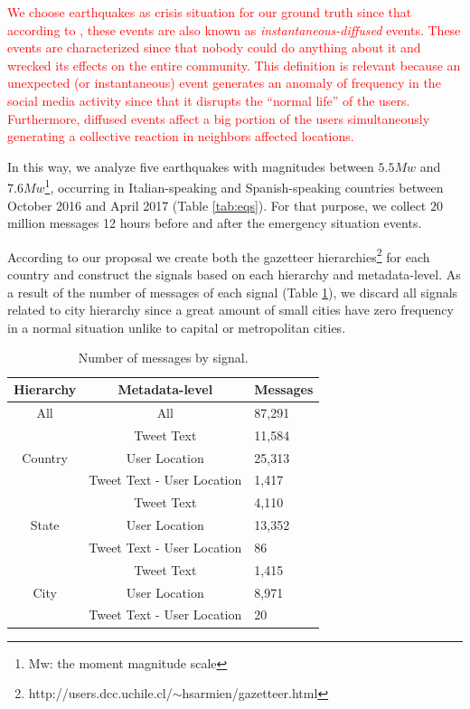 \documentclass[sigconf]{acmart}
\begin{document}
\textcolor{red}{We choose earthquakes as crisis situation for our ground truth since that according to \citeauthor{carr1932disaster} \cite{carr1932disaster}, these events are also known as \textit{instantaneous-diffused} events. These events are characterized since that nobody could do anything about it and wrecked its effects on the entire community. This definition is relevant because an unexpected (or instantaneous) event generates an anomaly of frequency in the social media activity since that it disrupts the ``normal life'' of the users. Furthermore, diffused events affect a big portion of the users simultaneously generating a collective reaction in neighbors affected locations.} 

In this way, we analyze five earthquakes with magnitudes between $5.5Mw$ and $7.6Mw$\footnote{Mw: the moment magnitude scale}, occurring in Italian-speaking and Spanish-speaking countries between October 2016 and April 2017 (Table \ref{tab:eqs}). For that purpose, we collect $20$ million messages 12 hours before and after the emergency situation events. 

According to our proposal we create both the gazetteer hierarchies\footnote{http://users.dcc.uchile.cl/$\sim$hsarmien/gazetteer.html} for each country and construct the signals based on each hierarchy and metadata-level. As a result of the number of messages of each signal (Table \ref{tab:message_signal}), we discard all signals related to city hierarchy since a great amount of small cities have zero frequency in a normal situation unlike to capital or metropolitan cities.

\begin{table}
	\caption{Number of messages by signal.}
	\label{tab:message_signal}
	\begin{tabular}{ccl}
		\toprule
		Hierarchy&Metadata-level&Messages\\
		\midrule
		All & All & 87,291 \\
		\midrule
	    \multirow{3}{*}{Country} & Tweet Text & 11,584 \\
	    & User Location & 25,313\\
	    & Tweet Text - User Location & 1,417\\	
		\bottomrule
		\multirow{3}{*}{State} & Tweet Text & 4,110 \\
		& User Location & 13,352\\
		& Tweet Text - User Location & 86\\
		\midrule
		\multirow{3}{*}{City} & Tweet Text & 1,415 \\
		& User Location & 8,971\\
		& Tweet Text - User Location & 20\\
		\bottomrule
	\end{tabular}
\end{table} 
\end{document}
